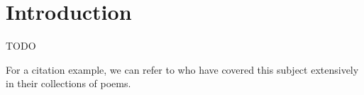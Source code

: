 \chapter{Introduction}
\label{chapter:intro}


{\color{red} TODO}

For a citation example, we can refer to \citet{ThesisGrading} who have covered this subject
extensively in their collections of poems.

